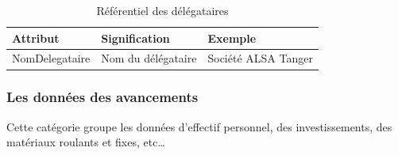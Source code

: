 \documentclass[a4paper]{report}
\begin{document}
\begin{doublespace}
	\begin{table}[H]
		\begin{center}
			\begin{tabularx}{17.5cm}{|p{3cm}|p{3cm}|X|}
				\hline
				\textbf{Attribut} & \textbf{Signification} & \textbf{Exemple}    \\
				\hline
				NomDelegataire    & Nom du délégataire     & Société ALSA Tanger \\
				\hline
			\end{tabularx}
			\caption{Référentiel des délégataires}
		\end{center}
	\end{table}

	\newpage
	\subsubsection{Les données des avancements}

	Cette catégorie groupe les données d'effectif personnel, des investissements, des matériaux roulants et fixes, etc\dots



\end{doublespace}
\end{document}
